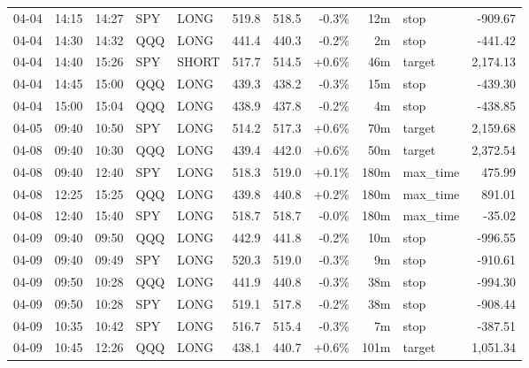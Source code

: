 \documentclass[11pt,a4paper,twoside]{article}
\begin{document}
\begin{center}
\begin{longtable}{>{\color{txtmain}}l l l l l r r r r >{\color{txtmain}}l r}
04-04 & 14:15 & 14:27 & SPY & LONG & 519.8 & 518.5 & \textcolor{lossred}{-0.3\%} & 12m & stop & \textcolor{lossred}{-909.67} \\
04-04 & 14:30 & 14:32 & QQQ & LONG & 441.4 & 440.3 & \textcolor{lossred}{-0.2\%} & 2m & stop & \textcolor{lossred}{-441.42} \\
04-04 & 14:40 & 15:26 & SPY & SHORT & 517.7 & 514.5 & \textcolor{wingreen}{+0.6\%} & 46m & target & \textcolor{wingreen}{2,174.13} \\
04-04 & 14:45 & 15:00 & QQQ & LONG & 439.3 & 438.2 & \textcolor{lossred}{-0.3\%} & 15m & stop & \textcolor{lossred}{-439.30} \\
04-04 & 15:00 & 15:04 & QQQ & LONG & 438.9 & 437.8 & \textcolor{lossred}{-0.2\%} & 4m & stop & \textcolor{lossred}{-438.85} \\
04-05 & 09:40 & 10:50 & SPY & LONG & 514.2 & 517.3 & \textcolor{wingreen}{+0.6\%} & 70m & target & \textcolor{wingreen}{2,159.68} \\
04-08 & 09:40 & 10:30 & QQQ & LONG & 439.4 & 442.0 & \textcolor{wingreen}{+0.6\%} & 50m & target & \textcolor{wingreen}{2,372.54} \\
04-08 & 09:40 & 12:40 & SPY & LONG & 518.3 & 519.0 & \textcolor{wingreen}{+0.1\%} & 180m & max\_time & \textcolor{wingreen}{475.99} \\
04-08 & 12:25 & 15:25 & QQQ & LONG & 439.8 & 440.8 & \textcolor{wingreen}{+0.2\%} & 180m & max\_time & \textcolor{wingreen}{891.01} \\
04-08 & 12:40 & 15:40 & SPY & LONG & 518.7 & 518.7 & \textcolor{lossred}{-0.0\%} & 180m & max\_time & \textcolor{lossred}{-35.02} \\
04-09 & 09:40 & 09:50 & QQQ & LONG & 442.9 & 441.8 & \textcolor{lossred}{-0.2\%} & 10m & stop & \textcolor{lossred}{-996.55} \\
04-09 & 09:40 & 09:49 & SPY & LONG & 520.3 & 519.0 & \textcolor{lossred}{-0.3\%} & 9m & stop & \textcolor{lossred}{-910.61} \\
04-09 & 09:50 & 10:28 & QQQ & LONG & 441.9 & 440.8 & \textcolor{lossred}{-0.3\%} & 38m & stop & \textcolor{lossred}{-994.30} \\
04-09 & 09:50 & 10:28 & SPY & LONG & 519.1 & 517.8 & \textcolor{lossred}{-0.2\%} & 38m & stop & \textcolor{lossred}{-908.44} \\
04-09 & 10:35 & 10:42 & SPY & LONG & 516.7 & 515.4 & \textcolor{lossred}{-0.3\%} & 7m & stop & \textcolor{lossred}{-387.51} \\
04-09 & 10:45 & 12:26 & QQQ & LONG & 438.1 & 440.7 & \textcolor{wingreen}{+0.6\%} & 101m & target & \textcolor{wingreen}{1,051.34} \\

\end{longtable}
\end{center}
\end{document}
